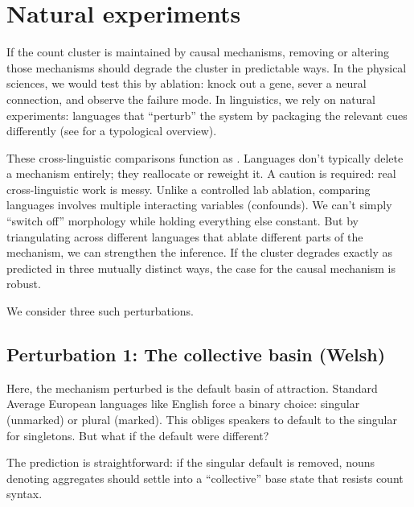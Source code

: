 \section{Natural experiments}
\label{sec:9:natural-experiments}

If the count cluster is maintained by causal mechanisms, removing or altering those mechanisms should degrade the cluster in predictable ways. In the physical sciences, we would test this by ablation: knock out a gene, sever a neural connection, and observe the failure mode. In linguistics, we rely on natural experiments: languages that \enquote{perturb} the system by packaging the relevant cues differently (see \textcite{doetjes2012} for a typological overview).

These cross-linguistic comparisons function as . Languages don't typically delete a mechanism entirely; they reallocate or reweight it. A caution is required: real cross-linguistic work is messy. Unlike a controlled lab ablation, comparing languages involves multiple interacting variables (confounds). We can't simply \enquote{switch off} morphology while holding everything else constant. But by triangulating across different languages that ablate different parts of the mechanism, we can strengthen the inference. If the cluster degrades exactly as predicted in three mutually distinct ways, the case for the causal mechanism is robust.

We consider three such perturbations.

\subsection{Perturbation 1: The collective basin (Welsh)}
\label{sec:9:welsh}

Here, the mechanism perturbed is the default basin of attraction. Standard Average European languages like English force a binary choice: singular (unmarked) or plural (marked). This obliges speakers to default to the singular for singletons. But what if the default were different?

The prediction is straightforward: if the singular default is removed, nouns denoting aggregates should settle into a \enquote{collective} base state that resists count syntax.

